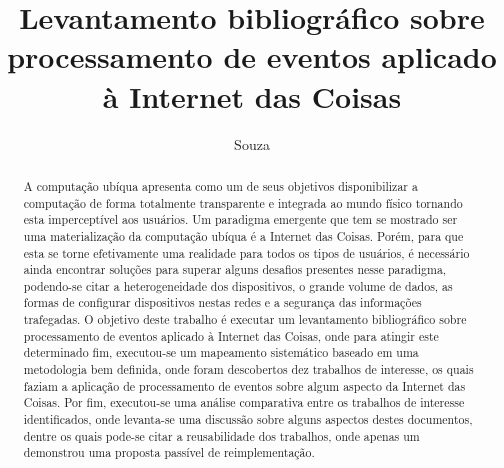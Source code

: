 \documentclass[ti,table]{texufpel} %
\title{Levantamento bibliográfico sobre processamento de eventos aplicado à Internet das Coisas}
\author{Souza}{Weslen Schiavon}
\begin{document}
 

  

\renewcommand{\advisorname}{Orientadora}           %

\renewcommand{\coadvisorname}{Coorientador}      %

  

\maketitle  

  

\sloppy 

  


  

  

\begin{abstract} 

A computação ubíqua apresenta como um de seus objetivos disponibilizar a computação de forma totalmente transparente e integrada ao mundo físico tornando esta imperceptível aos usuários. Um paradigma emergente que tem se mostrado ser uma materialização da computação ubíqua é a Internet das Coisas. Porém, para que esta se torne efetivamente uma realidade para todos os tipos de usuários, é necessário ainda encontrar soluções para superar alguns desafios presentes nesse paradigma, podendo-se citar a heterogeneidade dos dispositivos, o grande volume de dados, as formas de configurar dispositivos nestas redes e a segurança das informações trafegadas. O objetivo deste trabalho é executar um levantamento bibliográfico sobre processamento de eventos aplicado à Internet das Coisas, onde para atingir este determinado fim, executou-se um mapeamento sistemático baseado em uma metodologia bem definida, onde foram descobertos dez trabalhos de interesse, os quais faziam a aplicação de processamento de eventos sobre algum aspecto da Internet das Coisas. Por fim, executou-se uma análise comparativa entre os trabalhos de interesse identificados, onde levanta-se uma discussão sobre alguns aspectos destes documentos, dentre os quais pode-se citar a reusabilidade dos trabalhos, onde apenas um demonstrou uma proposta passível de reimplementação. 

\end{abstract} 

  

  
\end{document}
